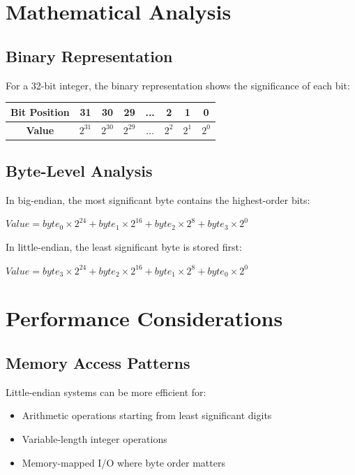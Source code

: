 \documentclass[11pt,a4paper]{article}
\begin{document}
\section{Mathematical Analysis}

\subsection{Binary Representation}

For a 32-bit integer, the binary representation shows the significance of each bit:

\begin{center}
\begin{tabular}{|c|c|c|c|c|c|c|c|}
\hline
\textbf{Bit Position} & 31 & 30 & 29 & ... & 2 & 1 & 0 \\
\hline
\textbf{Value} & $2^{31}$ & $2^{30}$ & $2^{29}$ & ... & $2^2$ & $2^1$ & $2^0$ \\
\hline
\end{tabular}
\end{center}

\subsection{Byte-Level Analysis}

In big-endian, the most significant byte contains the highest-order bits:

\begin{center}
$Value = byte_0 \times 2^{24} + byte_1 \times 2^{16} + byte_2 \times 2^8 + byte_3 \times 2^0$
\end{center}

In little-endian, the least significant byte is stored first:

\begin{center}
$Value = byte_3 \times 2^{24} + byte_2 \times 2^{16} + byte_1 \times 2^8 + byte_0 \times 2^0$
\end{center}

\section{Performance Considerations}

\subsection{Memory Access Patterns}

Little-endian systems can be more efficient for:
\begin{itemize}
    \item Arithmetic operations starting from least significant digits
    \item Variable-length integer operations
    \item Memory-mapped I/O where byte order matters
\end{itemize}
\end{document}
